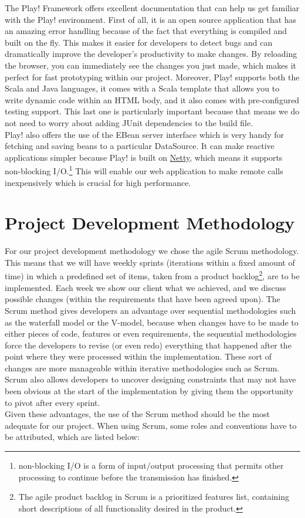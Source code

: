  
The Play! Framework offers excellent documentation\cite{playDoc} that can help us get familiar with the Play! environment. First of all, it is an open source application that has an amazing error handling because of the fact that everything is compiled and built on the fly. This makes it easier for developers to detect bugs and can dramatically improve the developer's productivity to make changes. By reloading the browser, you can immediately see the changes you just made, which makes it perfect for fast prototyping within our project. Moreover, Play! supports both the Scala and Java languages, it comes with a Scala template that allows you to write dynamic code within an HTML body, and it also comes with pre-configured testing support. This last one is particularly important because that means we do not need to worry about adding JUnit dependencies to the build file. \\
Play! also offers the use of the EBean server interface which is very handy for fetching and saving beans to a particular DataSource. It can make reactive applications simpler because Play! is built on \href{http://netty.io/}{Netty}, which means it supports non-blocking I/O.\footnote{ non-blocking I/O is a form of input/output processing that permits other processing to continue before the transmission has finished.} This will enable our web application to make remote calls inexpensively which is crucial for high performance.

\section{Project Development Methodology} %

For our project development methodology we chose the agile Scrum methodology. This means that we will have weekly sprints (iterations within a fixed amount of time) in which a predefined set of items, taken from a product backlog\footnote{The agile product backlog in Scrum is a prioritized features list, containing short descriptions of all functionality desired in the product.\cite{backlog} }, are to be implemented. Each week we show our client what we achieved, and we discuss possible changes (within the requirements that have been agreed upon). The Scrum method gives developers an advantage over sequential methodologies such as the waterfall model or the V-model, because when changes have to be made to either pieces of code, features or even requirements, the sequential methodologies force the developers to revise (or even redo) everything that happened after the point where they were processed within the implementation. These sort of changes are more manageable within iterative methodologies such as Scrum. Scrum also allows developers to uncover designing constraints that may not have been obvious at the start of the implementation by giving them the opportunity to pivot after every sprint. \\
Given these advantages, the use of the Scrum method should be the most adequate for our project. 
\newpage
When using Scrum, some roles and conventions have to be attributed, which are listed below:

